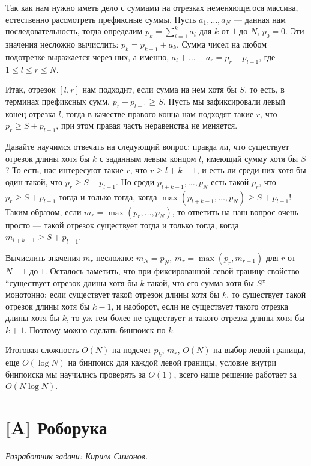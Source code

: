 \documentclass[12pt]{article}
\theoremstyle{definition}
\begin{document}
Так как нам нужно иметь дело с суммами на отрезках неменяющегося массива,
естественно рассмотреть префиксные суммы. Пусть $a_1,\dots,a_N$ --- данная нам
последовательность, тогда определим $p_k = \sum_{i = 1}^k a_i$ для $k$ от $1$ до $N$,
$p_0 = 0$. Эти значения несложно вычислить: $p_k = p_{k - 1} + a_k$. Сумма чисел на
любом подотрезке выражается через них, а именно, $a_l + \dots + a_r = p_r - p_{l - 1}$,
где $1 \le l \le r \le N$.

Итак, отрезок $[l, r]$ нам подходит, если сумма на нем хотя бы $S$, то есть,
в терминах префиксных сумм, $p_r - p_{l - 1} \ge S$. Пусть мы зафиксировали
левый конец отрезка $l$, тогда в качестве правого конца нам подходят такие $r$,
что $p_r \ge S + p_{l - 1}$, при этом правая часть неравенства не меняется.

Давайте научимся отвечать на следующий вопрос: правда ли, что существует отрезок длины
хотя бы $k$ с заданным левым концом $l$, имеющий сумму хотя бы $S$? То есть, нас
интересуют такие $r$, что $r \ge l + k - 1$, и есть ли среди них хотя бы один такой, что
$p_r \ge S + p_{l - 1}$. Но среди $p_{l + k - 1},\dots, p_N$ есть такой $p_r$, что
$p_r \ge S + p_{l - 1}$ тогда и только тогда, когда
$\max(p_{l + k - 1}, \dots, p_N) \ge S + p_{l - 1}$! Таким образом,
если $m_r = \max(p_r, \dots, p_N)$, то ответить на наш вопрос очень просто ---
такой отрезок существует тогда и только тогда, когда $m_{l + k - 1} \ge S + p_{l - 1}$.

Вычислить значения $m_r$ несложно: $m_N = p_N$, $m_r = \max(p_r, m_{r + 1})$ для $r$ от
$N - 1$ до $1$. Осталось заметить, что при фиксированной левой границе свойство
``существует отрезок длины хотя бы $k$ такой, что его сумма хотя бы $S$'' монотонно:
если существует такой отрезок длины хотя бы $k$, то существует такой отрезок длины
хотя бы $k - 1$, и наоборот, если не существует такого отрезка длины хотя бы $k$, то уж
тем более не существует и такого отрезка длины хотя бы $k + 1$. Поэтому можно сделать
бинпоиск по $k$.

Итоговая сложность $O(N)$ на подсчет $p_k$, $m_r$, $O(N)$ на выбор левой границы,
еще $O(\log N)$ на бинпоиск для каждой левой границы, условие внутри бинпоиска
мы научились проверять за $O(1)$, всего наше решение работает за $O(N \log N)$.

\section{[A] Роборука}
\textit{Разработчик задачи: Кирилл Симонов.}
\end{document}
